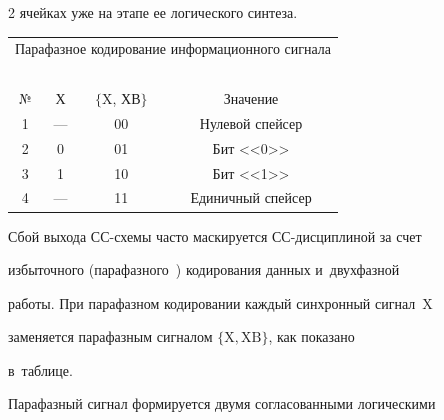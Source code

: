 \begin{multicols}{2}
ячейках уже на этапе ее логического синтеза. 




{\small

  \begin{center}

  \begin{tabular}{|c|c|c|c|}

  \multicolumn{4}{c}{Парафазное кодирование информационного сигнала}\\

  \multicolumn{4}{c}{\ }\\[-6pt]

  \hline

№&Х&$\{$X, ХВ$\}$&Значение\\

\hline

1&---&00&Нулевой спейсер\\

2&0&01&Бит <<0>>\\

3&1&10&Бит <<1>>\\

4&---&11&Единичный спейсер\\

\hline

\end{tabular}

\end{center}


}



\vspace*{9pt}

  

  Сбой выхода СС-схе\-мы часто маскируется СС-дис\-цип\-ли\-ной за счет 

избыточного (парафазного~\cite{9-step}) кодирования данных и~двухфазной 

работы. При парафазном кодировании каждый синхронный сигнал~X 

заменяется парафазным сигналом $\{\mathrm{X, XB}\}$, как показано 

в~таб\-лице. 

  



  

  Парафазный сигнал формируется двумя согласованными логическими 


\end{multicols}
